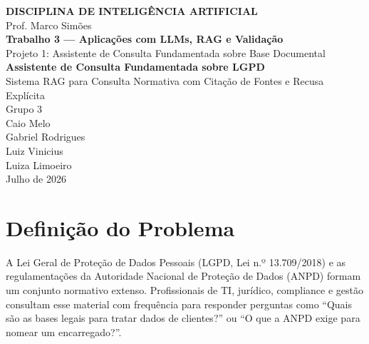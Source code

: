 \documentclass[
  12pt,
  a4paper,
  brazil,
  article,
  oneside,
  sumario=tradicional
]{abntex2}
\begin{document}
\thispagestyle{empty}
\begin{center}
{\large\bfseries DISCIPLINA DE INTELIGÊNCIA ARTIFICIAL}\\[0.2cm]
{\normalsize Prof. Marco Simões}\\[2.5cm]

{\LARGE\bfseries Trabalho 3 — Aplicações com LLMs, RAG e Validação}\\[0.4cm]
{\large Projeto 1: Assistente de Consulta Fundamentada sobre Base Documental}\\[2.5cm]

{\Large\bfseries Assistente de Consulta Fundamentada sobre LGPD}\\[0.5cm]
{\normalsize Sistema RAG para Consulta Normativa com Citação de Fontes e Recusa Explícita}\\[3cm]

{\large Grupo 3}\\[0.3cm]
{\normalsize
Caio Melo\\
Gabriel Rodrigues\\
Luiz Vinicius\\
Luiza Limoeiro
}\\[2.5cm]

{\normalsize Julho de 2026}
\end{center}
\clearpage

\tableofcontents*
\cleardoublepage

\section{Definição do Problema}

A Lei Geral de Proteção de Dados Pessoais (LGPD, Lei n.º 13.709/2018) e as
regulamentações da Autoridade Nacional de Proteção de Dados (ANPD) formam um conjunto
normativo extenso. Profissionais de TI, jurídico, compliance e gestão consultam esse
material com frequência para responder perguntas como ``Quais são as bases legais para
tratar dados de clientes?'' ou ``O que a ANPD exige para nomear um encarregado?''.
\end{document}
